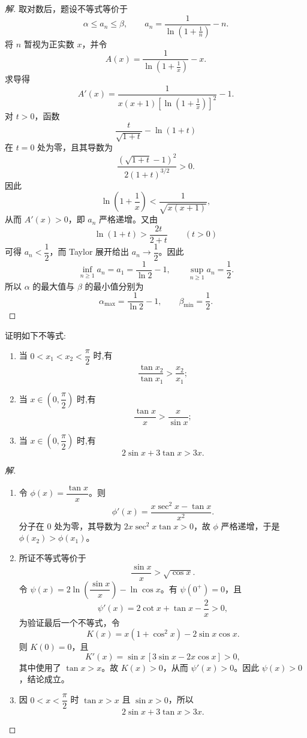 \documentclass[../../数学分析培优讲义(答案版).tex]{subfiles}
\begin{document}
\begin{proof}[解]
取对数后，题设不等式等价于
\[
    \alpha\leq a_n\leq\beta,
    \qquad
    a_n=\dfrac{1}{\ln(1+\frac{1}{n})}-n.
\]
将 $n$ 暂视为正实数 $x$，并令
\[
    A(x)=\dfrac{1}{\ln(1+\frac{1}{x})}-x.
\]
求导得
\[
    A'(x)=\dfrac{1}{x(x+1)\left[\ln(1+\frac{1}{x})\right]^2}-1.
\]
对 $t>0$，函数
\[
    \dfrac{t}{\sqrt{1+t}}-\ln(1+t)
\]
在 $t=0$ 处为零，且其导数为
\[
    \dfrac{(\sqrt{1+t}-1)^2}{2(1+t)^{3/2}}>0.
\]
因此
\[
    \ln\left(1+\dfrac{1}{x}\right)
    <\dfrac{1}{\sqrt{x(x+1)}},
\]
从而 $A'(x)>0$，即 $a_n$ 严格递增。又由
\[
    \ln(1+t)>\dfrac{2t}{2+t}
    \qquad(t>0)
\]
可得 $a_n<\dfrac{1}{2}$，而 Taylor 展开给出 $a_n\to\dfrac{1}{2}$。因此
\[
    \inf\limits_{n\geq1}a_n=a_1=\dfrac{1}{\ln2}-1,
    \qquad
    \sup\limits_{n\geq1}a_n=\dfrac{1}{2}.
\]
所以 $\alpha$ 的最大值与 $\beta$ 的最小值分别为
\[
    \boxed{\alpha_{\max}=\dfrac{1}{\ln2}-1},
    \qquad
    \boxed{\beta_{\min}=\dfrac{1}{2}}.
\]
\end{proof}

\begin{example}
证明如下不等式:
\begin{enumerate}[label=(\arabic*)]
    \item 当 $0<x_1<x_2<\dfrac{\pi}{2}$ 时,有
    \[
        \dfrac{\tan x_2}{\tan x_1}>\dfrac{x_2}{x_1};
    \]
    \item 当 $x\in\left(0,\dfrac{\pi}{2}\right)$ 时,有
    \[
        \dfrac{\tan x}{x}>\dfrac{x}{\sin x};
    \]
    \item 当 $x\in\left(0,\dfrac{\pi}{2}\right)$ 时,有
    \[
        2\sin x+3\tan x>3x.
    \]
\end{enumerate}
\end{example}

\begin{proof}[解]
\begin{enumerate}[label=(\arabic*)]
    \item 令 $\phi(x)=\dfrac{\tan x}{x}$。则
    \[
        \phi'(x)=\dfrac{x\sec^2x-\tan x}{x^2}.
    \]
    分子在 $0$ 处为零，其导数为 $2x\sec^2x\tan x>0$，故 $\phi$ 严格递增，于是 $\phi(x_2)>\phi(x_1)$。

    \item 所证不等式等价于
    \[
        \dfrac{\sin x}{x}>\sqrt{\cos x}.
    \]
    令 $\psi(x)=2\ln\left(\dfrac{\sin x}{x}\right)-\ln\cos x$。有 $\psi(0^+)=0$，且
    \[
        \psi'(x)=2\cot x+\tan x-\dfrac{2}{x}>0,
    \]
    为验证最后一个不等式，令
    \[
        K(x)=x(1+\cos^2x)-2\sin x\cos x.
    \]
    则 $K(0)=0$，且
    \[
        K'(x)=\sin x\,[3\sin x-2x\cos x]>0,
    \]
    其中使用了 $\tan x>x$。故 $K(x)>0$，从而 $\psi'(x)>0$。因此 $\psi(x)>0$，结论成立。

    \item 因 $0<x<\dfrac{\pi}{2}$ 时 $\tan x>x$ 且 $\sin x>0$，所以
    \[
        2\sin x+3\tan x>3x.
    \]
\end{enumerate}
\end{proof}
\end{document}
